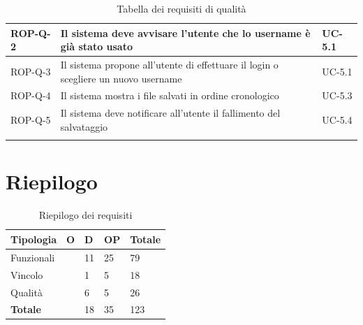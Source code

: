 \documentclass[11pt,a4paper]{article}
\begin{document}
\begin{longtable}{|p{}|>{\raggedright\arraybackslash}p{}|p{}|}
\hline
ROP-Q-2 & Il sistema deve avvisare l'utente che lo username è già stato usato & UC-5.1 \\
\hline
ROP-Q-3 & Il sistema propone all'utente di effettuare il login o scegliere un nuovo username & UC-5.1 \\
\hline
ROP-Q-4 & Il sistema mostra i file salvati in ordine cronologico & UC-5.3 \\
\hline
ROP-Q-5 & Il sistema deve notificare all'utente il fallimento del salvataggio & UC-5.4 \\
\hline
\addlinespace[1em]
\caption{Tabella dei requisiti di qualità}
\end{longtable}

\newpage

\section{Riepilogo}
\begin{table}[H]
\centering
\begin{tabular}{|p{}|>{\raggedright\arraybackslash}p{}|p{}|p{}|p{}|}
\hline
\textbf{Tipologia} & \textbf{O} & \textbf{D} & \textbf{OP} & \textbf{Totale}\\
\hline
Funzionali & 43 & 11 & 25 & 79 \\
\hline
Vincolo & 12 & 1 & 5 & 18 \\
\hline
Qualità & 15 & 6 & 5 & 26 \\
\hline
\textbf{Totale} & 70 & 18 & 35 & 123\\
\hline
\end{tabular}
\caption{Riepilogo dei requisiti}
\end{table}
\end{document}
